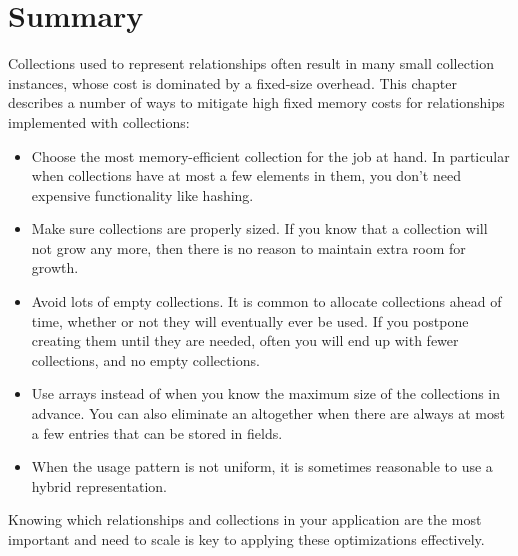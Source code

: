 

\section{Summary}

Collections used to represent relationships often result in many small
collection instances, whose cost is dominated by a fixed-size
overhead. This chapter describes a number of ways to mitigate high fixed memory
costs for relationships implemented with collections:
\begin{itemize}
  \item Choose the most memory-efficient collection for the job at hand. In
  particular when collections have at most a few elements in them, you don't
  need expensive functionality like hashing. 
  \item Make sure collections are properly sized. If you know that a collection
  will not grow any more, then there is no reason to maintain extra room for
  growth.
  \item Avoid lots of empty collections. It is common to allocate collections 
 ahead of time, whether or not they will eventually ever be used. If you
 postpone creating them until they are needed, often you will end up with fewer collections, 
 and no empty collections.
 \item Use arrays instead of  when you know the maximum size
 of the collections in advance. You can also eliminate an
  altogether when there are always at most a few entries that
 can be stored in fields.
 \item When the usage pattern is not uniform, it is sometimes reasonable to use
 a hybrid representation.
\end{itemize}
Knowing which relationships and collections in your application are the most
important and need to scale is key to applying these optimizations effectively.  




